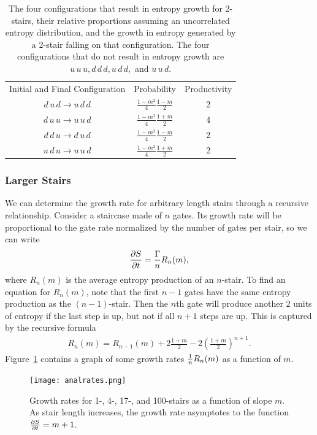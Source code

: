 \begin{table}
	\centering
	\begin{tabular}{ccc}
		Initial and Final 
		Configuration        & Probability         & Productivity\\
		$d\,u\,d\to u\,d\,d$ & $\frac{1-m^2}{4}\frac{1-m}{2}$ & 2\\
		$d\,u\,u\to u\,u\,d$ & $\frac{1-m^2}{4}\frac{1+m}{2}$ & 4\\
		$d\,d\,u\to d\,u\,d$ & $\frac{1-m^2}{4}\frac{1-m}{2}$ & 2\\
		$u\,d\,u\to u\,u\,d$ & $\frac{1-m^2}{4}\frac{1+m}{2}$ & 2
	\end{tabular}
	\caption{The four configurations that result in entropy growth for 2-stairs, their relative proportions assuming an uncorrelated entropy distribution, and the growth in entropy generated by a 2-stair falling on that configuration. The four configurations that do not result in entropy growth are $u\,u\,u, d\,d\,d, u\,d\,d,$ and $u\,u\,d$.}
	\label{tab:2stair}
\end{table}

\subsubsection{Larger Stairs} \emph{} \label{subsub:largestairs}

We can determine the growth rate for arbitrary length stairs through a recursive relationship. Consider a staircase made of $n$ gates. Its growth rate will be proportional to the gate rate normalized by the number of gates per stair, so we can write
\begin{align}
\frac{\partial S}{\partial t} = \frac{\Gamma}{n}R_n(m), \label{eqn:growthrate}
\end{align}
where $R_n(m)$ is the average entropy production of an $n$-stair. To find an equation for $R_n(m)$, note that the first $n-1$ gates have the same entropy production as the $(n-1)$-stair. Then the $n$th gate will produce another 2 units of entropy if the last step is up, but not if all $n+1$ steps are up. This is captured by the recursive formula
\begin{align}
R_n(m) = R_{n-1}(m)+2\frac{1+m}{2} - 2\left(\frac{1+m}{2}\right)^{n+1}. \label{eqn:raterecur}
\end{align}
Figure~\ref{fig:growthrates} contains a graph of some growth rates $\frac{1}{n}R_n(m)$ as a function of $m$.

\begin{figure}
	\centering
	\texttt{[image: analrates.png]}
	\caption{Growth rates for 1-, 4-, 17-, and 100-stairs as a function of slope $m$. As stair length increases, the growth rate asymptotes to the function $\frac{\partial S}{\partial t} = m+1$.}
	\label{fig:growthrates}
\end{figure}

